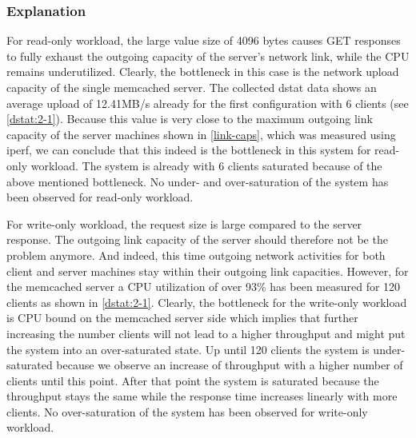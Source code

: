 \documentclass[11pt,a4paper]{article}
\begin{document}
\subsubsection{Explanation}
For read-only workload, the large value size of 4096 bytes causes GET responses to fully exhaust the outgoing capacity of the server's network link, while the CPU remains underutilized. Clearly, the bottleneck in this case is the network upload capacity of the single memcached server. The collected dstat data shows an average upload of 12.41MB/s already for the first configuration with 6 clients (see \autoref{dstat:2-1}). Because this value is very close to the maximum outgoing link capacity of the server machines shown in \autoref{link-caps}, which was measured using iperf, we can conclude that this indeed is the bottleneck in this system for read-only workload. The system is already with 6 clients saturated because of the above mentioned bottleneck. No under- and over-saturation of the system has been observed for read-only workload.

For write-only workload, the request size is large compared to the server response. The outgoing link capacity of the server should therefore not be the problem anymore. And indeed, this time outgoing network activities for both client and server machines stay within their outgoing link capacities. However, for the memcached server a CPU utilization of over 93\% has been measured for 120 clients as shown in \autoref{dstat:2-1}. Clearly, the  bottleneck for the write-only workload is CPU bound on the memcached server side which implies that further increasing the number clients will not lead to a higher throughput and might put the system into an over-saturated state.
Up until 120 clients the system is under-saturated because we observe an increase of throughput with a higher number of clients until this point. After that point the system is saturated because the throughput stays the same while the response time increases linearly with more clients. No over-saturation of the system has been observed for write-only workload.
\end{document}
